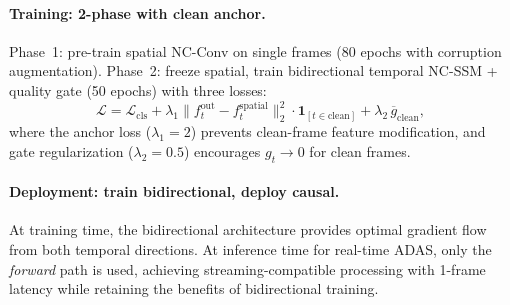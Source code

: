 \documentclass[10pt,twocolumn,letterpaper]{article}
\begin{document}
\paragraph{Training: 2-phase with clean anchor.}
Phase~1: pre-train spatial NC-Conv on single frames (80 epochs with corruption augmentation).
Phase~2: freeze spatial, train bidirectional temporal NC-SSM + quality gate (50 epochs) with three losses:
\begin{equation}
\mathcal{L} = \mathcal{L}_{\text{cls}} + \lambda_1 \|f_t^{\text{out}} - f_t^{\text{spatial}}\|_2^2 \cdot \mathbf{1}_{[t \in \text{clean}]} + \lambda_2 \, \overline{g}_{\text{clean}},
\end{equation}
where the anchor loss ($\lambda_1{=}2$) prevents clean-frame feature modification, and gate regularization ($\lambda_2{=}0.5$) encourages $g_t \to 0$ for clean frames.

\paragraph{Deployment: train bidirectional, deploy causal.}
At training time, the bidirectional architecture provides optimal gradient flow from both temporal directions.
At inference time for real-time ADAS, only the \emph{forward} path is used, achieving streaming-compatible processing with 1-frame latency while retaining the benefits of bidirectional training.
\end{document}
